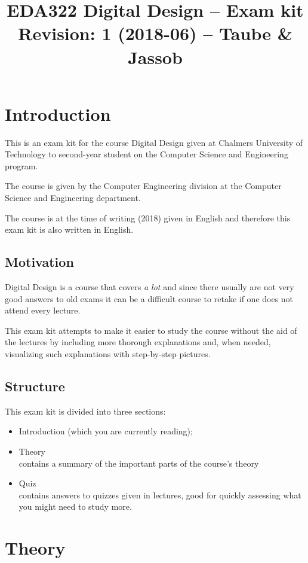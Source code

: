 \documentclass{article}
\title{EDA322 Digital Design -- Exam kit \\
  \small Revision: 1 (2018-06) -- Taube \& Jassob
}
\begin{document}
\maketitle
\tableofcontents

\newpage

\section{Introduction}
This is an exam kit for the course Digital Design given at Chalmers
University of Technology to second-year student on the Computer
Science and Engineering program.

The course is given by the Computer Engineering division at the
Computer Science and Engineering department.

The course is at the time of writing (2018) given in English and
therefore this exam kit is also written in English.

\subsection{Motivation}
Digital Design is a course that covers {\it a lot} and since there
usually are not very good answers to old exams it can be a difficult
course to retake if one does not attend every lecture.

This exam kit attempts to make it easier to study the course without
the aid of the lectures by including more thorough explanations and,
when needed, visualizing such explanations with step-by-step pictures.

\subsection{Structure}

This exam kit is divided into three sections:
\begin{itemize}
\item Introduction (which you are currently reading);
\item Theory \\
  contains a summary of the important parts of the course's theory
\item Quiz \\
  contains answers to quizzes given in lectures, good for quickly
  assessing what you might need to study more.
\end{itemize}

\newpage

\section{Theory}
\end{document}
